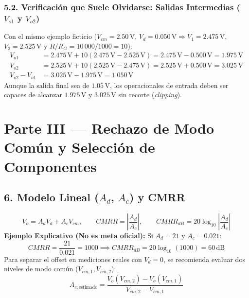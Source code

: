 \documentclass[10pt, a4paper]{article}
\begin{document}
\subsubsection*{5.2. Verificación que Suele Olvidarse: Salidas Intermedias ($V_{o1}$ y $V_{o2}$)}
Con el mismo ejemplo ficticio ($V_{cm}=2.50\,\text{V}$, $V_d=0.050\,\text{V} \Rightarrow V_1=2.475\,\text{V}$, $V_2=2.525\,\text{V}$ y $R/R_G = 10\,000/1000 = 10$):
\begin{align}
    V_{o1} &= 2.475\,\text{V} + 10(2.475\,\text{V} - 2.525\,\text{V}) = 2.475\,\text{V} - 0.500\,\text{V} = 1.975\,\text{V} \\
    V_{o2} &= 2.525\,\text{V} + 10(2.525\,\text{V} - 2.475\,\text{V}) = 2.525\,\text{V} + 0.500\,\text{V} = 3.025\,\text{V} \\
    V_{o2} - V_{o1} &= 3.025\,\text{V} - 1.975\,\text{V} = 1.050\,\text{V}
\end{align}
Aunque la salida final sea de $1.05\,\text{V}$, los operacionales de entrada deben ser capaces de alcanzar $1.975\,\text{V}$ y $3.025\,\text{V}$ sin recorte (\textit{clipping}).

\section*{Parte III — Rechazo de Modo Común y Selección de Componentes}

\subsection*{6. Modelo Lineal ($A_d$, $A_c$) y CMRR}
\begin{equation}
    \boxed{V_o = A_d V_d + A_c V_{cm}}, \qquad \boxed{CMRR = \left|\frac{A_d}{A_c}\right|}, \qquad \boxed{CMRR_{dB} = 20\log_{10}\left|\frac{A_d}{A_c}\right|}
\end{equation}
\textbf{Ejemplo Explicativo (No es meta oficial):} Si $A_d = 21$ y $A_c = 0.021$:
\begin{equation*}
    CMRR = \frac{21}{0.021} = 1000 \implies CMRR_{dB} = 20\log_{10}(1000) = 60\,\text{dB}
\end{equation*}
Para separar el offset en mediciones reales con $V_d = 0$, se recomienda evaluar dos niveles de modo común ($V_{cm,1}, V_{cm,2}$):
\begin{equation}
    A_{c,\text{estimado}} = \frac{V_o(V_{cm,2}) - V_o(V_{cm,1})}{V_{cm,2} - V_{cm,1}}
\end{equation}
\end{document}
